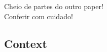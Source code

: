 \documentclass[twoside,a4paper,12pt,english]{inac19}
\begin{document}
{\Huge Cheio de partes do outro paper!}\\
{\Huge Conferir com cuidado!}\\





\subsection{Context}

\end{document}
